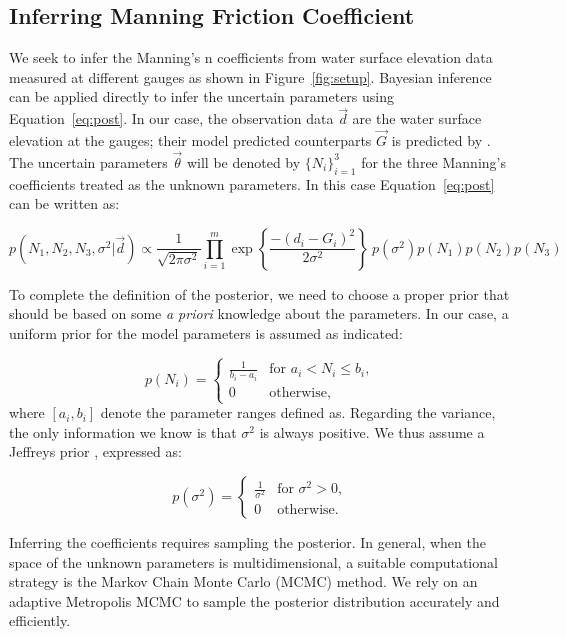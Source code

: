 \subsection{Inferring Manning Friction Coefficient}
 \label{sec:manning}
 
We seek to infer the Manning's n coefficients from water surface elevation
data measured at different gauges as shown in Figure~\ref{fig:setup}.
Bayesian inference can be applied directly to infer the uncertain parameters
using Equation~\eqref{eq:post}. In our case, the observation data $\vec d$ 
are the water surface elevation at the gauges;
their model predicted counterparts $\vec G$ is predicted by \geoclaw.
The uncertain parameters $\vec \theta$ will be denoted by $\{N_i\}_{i=1}^3$ for the
three Manning's coefficients treated as the unknown parameters. 
In this case  Equation~\eqref{eq:post} can be written as:

\begin{equation} 
p(N_1,N_2,N_3,\sigma^2 | \vec d) 
\propto \frac{1}{\sqrt{2 \pi \sigma^2}} 
 \prod_{i=1}^m  
\exp \left\lbrace \frac{-(d_i - G_i)^2}{2 \sigma^2} \right\rbrace
\ p(\sigma^2)p(N_1)p(N_2) p(N_3)
\label{eq:post_coef}
\end{equation}

To complete the definition of the posterior, we need to choose a proper prior that should be based 
on some \emph{a priori} knowledge about the parameters. In our case, a uniform
prior for the model parameters is assumed as indicated:

\begin{equation} 
p(N_i) = \begin{cases}
		\displaystyle \frac{1}{b_i-a_i} &\text{for~} a_i <  N_i \leq b_i ,  \\
		0 &\text{otherwise}  , 
\end{cases}
\end{equation}
where $ [a_i,b_i]$ denote the parameter ranges defined as.
Regarding the variance, the only information we know 
is that $\sigma^2$ is always positive.
We thus assume a Jeffreys prior \citep{sivia}, expressed as:

\begin{equation} 
p(\sigma^2) =  \begin{cases}
		\displaystyle \frac{1}{\sigma^2} &\text{for~} \sigma^2 > 0,  \\
		0 &\text{otherwise}. 
		\end{cases}
\label{eq:var_pr}
\end{equation}

Inferring the coefficients requires 
sampling the posterior. In general, when the space of the unknown 
parameters is multidimensional, a suitable computational strategy is 
the Markov Chain Monte  Carlo (MCMC) method. 
We rely on an adaptive Metropolis MCMC \citep{Gareth2009,Haario2001} to
sample the posterior distribution accurately and efficiently.


